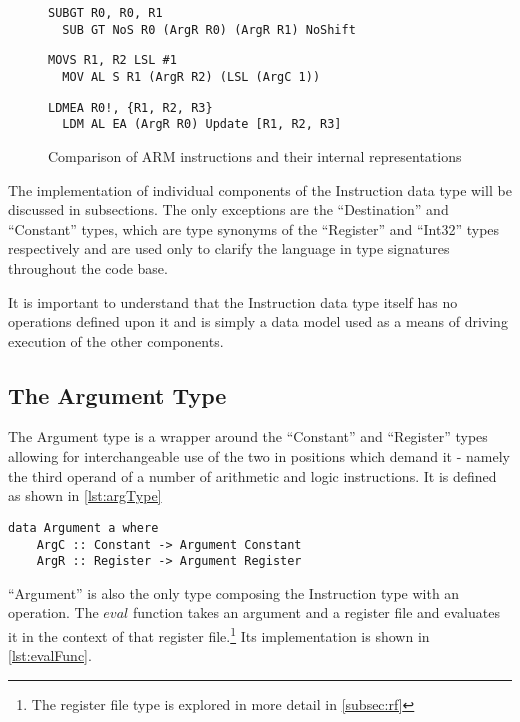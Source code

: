 \begin{figure}
\caption{Comparison of ARM instructions and their internal representations}
\label{fig:instructionComparison}
\begin{lstlisting}[numbers=none]
  SUBGT R0, R0, R1
  SUB GT NoS R0 (ArgR R0) (ArgR R1) NoShift
\end{lstlisting}
\begin{lstlisting}[numbers=none]
  MOVS R1, R2 LSL #1
  MOV AL S R1 (ArgR R2) (LSL (ArgC 1))
\end{lstlisting}
\begin{lstlisting}[numbers=none]
  LDMEA R0!, {R1, R2, R3}
  LDM AL EA (ArgR R0) Update [R1, R2, R3]
\end{lstlisting}
\end{figure}

The implementation of individual components of the Instruction data type will be discussed in subsections. The only exceptions are the ``Destination'' and ``Constant'' types, which are type synonyms of the ``Register'' and ``Int32'' types respectively and are used only to clarify the language in type signatures throughout the code base.

It is important to understand that the Instruction data type itself has no operations defined upon it and is simply a data model used as a means of driving execution of the other components.

\subsection{The Argument Type}

The Argument type is a wrapper around the ``Constant'' and ``Register'' types allowing for interchangeable use of the two in positions which demand it - namely the third operand of a number of arithmetic and logic instructions. It is defined as shown in \autoref{lst:argType}

\begin{lstlisting}[numbers=none,float,caption={The Argument data type},label={lst:argType}]
data Argument a where
    ArgC :: Constant -> Argument Constant
    ArgR :: Register -> Argument Register
\end{lstlisting}

``Argument'' is also the only type composing the Instruction type with an operation. The $eval$ function takes an argument and a register file and evaluates it in the context of that register file.\footnote{The register file type is explored in more detail in \ref{subsec:rf}} Its implementation is shown in \autoref{lst:evalFunc}.

